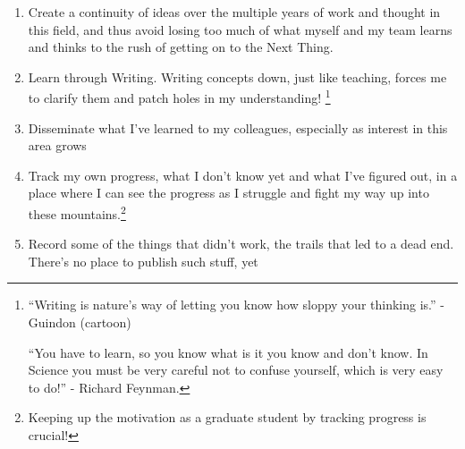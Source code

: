 \begin{enumerate}

\item Create a continuity of ideas over the multiple years of work and thought in this field, and thus avoid losing too much of what myself and my team learns and thinks to the rush of getting on to the Next Thing.

\item Learn through Writing. Writing concepts down, just like teaching, forces me to clarify them and patch holes in my understanding! \footnote{``Writing is nature's way of letting you know how sloppy your thinking is.'' - Guindon (cartoon)

``You have to learn, so you know what is it you know and don't know. In Science you must be very careful not to confuse yourself, which is very easy to do!'' - Richard Feynman.} 

\item Disseminate what I've learned to my colleagues, especially as interest in this area grows

\item Track my own progress, what I don't know yet and what I've figured out, in a place where I can see the progress as I struggle and fight my way up into these mountains.\footnote{Keeping up the motivation as a graduate student by tracking progress is crucial!}

\item Record some of the things that didn't work, the trails that led to a dead end. There's no place to publish such stuff, yet 

\end{enumerate}
